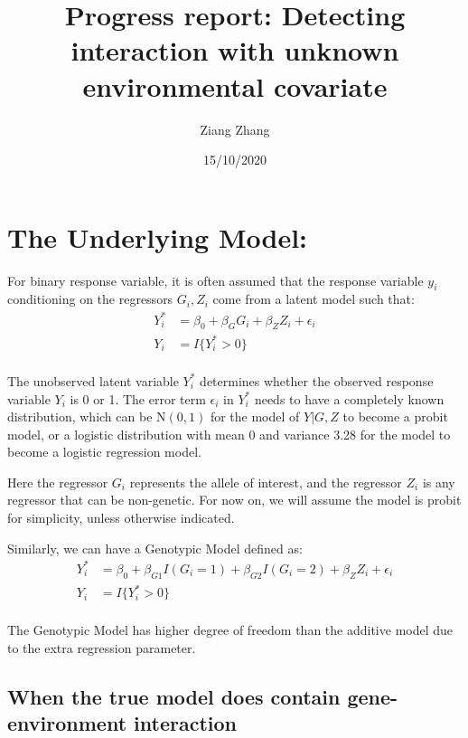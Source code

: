 \documentclass[
]{article}
\title{Progress report: Detecting interaction with unknown environmental
covariate}
\author{Ziang Zhang}
\date{15/10/2020}
\begin{document}
\maketitle

\hypertarget{the-underlying-model}{%
\section{The Underlying Model:}\label{the-underlying-model}}

For binary response variable, it is often assumed that the response
variable \(y_i\) conditioning on the regressors \(G_i,Z_i\) come from a
latent model such that: \begin{equation}\label{eqn:latentformulation}
\begin{aligned}
Y_i^* &= \beta_0 + \beta_G G_i + \beta_Z Z_i + \epsilon_i \\
Y_i &= I\{Y_i^*>0\} \\
\end{aligned}
\end{equation}

The unobserved latent variable \(Y_i^*\) determines whether the observed
response variable \(Y_i\) is 0 or 1. The error term \(\epsilon_i\) in
\(Y_i^*\) needs to have a completely known distribution, which can be
\(\text{N}(0,1)\) for the model of \(Y|G,Z\) to become a probit model,
or a logistic distribution with mean 0 and variance 3.28 for the model
to become a logistic regression model.

Here the regressor \(G_i\) represents the allele of interest, and the
regressor \(Z_i\) is any regressor that can be non-genetic. For now on,
we will assume the model is probit for simplicity, unless otherwise
indicated.

Similarly, we can have a Genotypic Model defined as:\\
\begin{equation}\label{eqn:latentformulationGeno}
\begin{aligned}
Y_i^* &= \beta_0 + \beta_{G1} I(G_i = 1) + \beta_{G2} I(G_i = 2) + \beta_Z Z_i + \epsilon_i \\
Y_i &= I\{Y_i^*>0\} \\
\end{aligned}
\end{equation}

The Genotypic Model has higher degree of freedom than the additive model
due to the extra regression parameter.

\hypertarget{when-the-true-model-does-contain-gene-environment-interaction}{%
\subsection{When the true model does contain gene-environment
interaction}\label{when-the-true-model-does-contain-gene-environment-interaction}}
\end{document}
